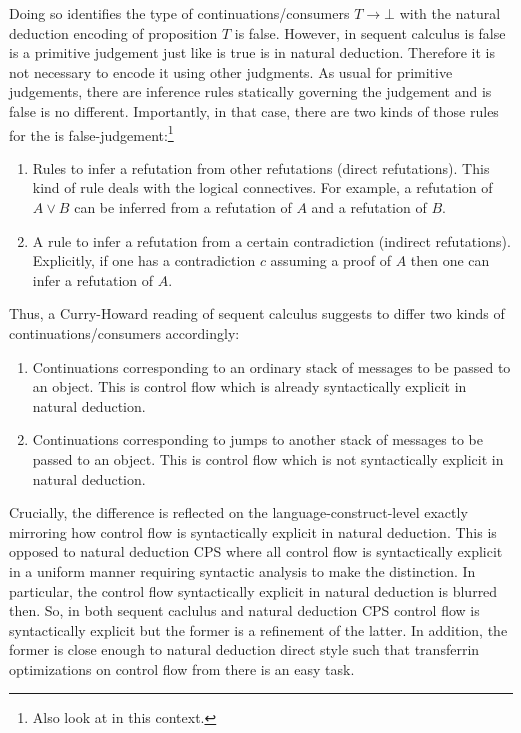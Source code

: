 Doing so identifies the type of continuations/consumers $T \to \bot$ with the natural deduction encoding of {\glqq}proposition $T$ is false{\grqq}.
However, in sequent calculus {\glqq}is false{\grqq} is a primitive judgement just like {\glqq}is true{\grqq} is in natural deduction.
Therefore it is not necessary to encode it using other judgments.
As usual for primitive judgements, there are inference rules statically governing the judgement and {\glqq}is false{\grqq} is no different.
Importantly, in that case, there are two kinds of those rules for the {\glqq}is false{\grqq}-judgement:\footnote{Also look at \cite{zeilberger2008unity} in this context.}
\begin{enumerate}
  \item
    Rules to infer a refutation from other refutations (direct refutations).
    This kind of rule deals with the logical connectives.
    For example, a refutation of $A \lor B$ can be inferred from a refutation of $A$ and a refutation of $B$.
  \item
    A rule to infer a refutation from a certain contradiction (indirect refutations).
    Explicitly, if one has a contradiction $c$ assuming a proof of $A$ then one can infer a refutation of $A$.
\end{enumerate}
Thus, a Curry-Howard reading of sequent calculus suggests to differ two kinds of continuations/consumers accordingly:
\begin{enumerate}
  \item
    Continuations corresponding to an ordinary stack of messages to be passed to an object. This is control flow which is already syntactically explicit in natural deduction.
  \item
    Continuations corresponding to jumps to another stack of messages to be passed to an object. This is control flow which is not syntactically explicit in natural deduction.
\end{enumerate}
Crucially, the difference is reflected on the language-construct-level exactly mirroring how control flow is syntactically explicit in natural deduction.
This is opposed to natural deduction CPS where all control flow is syntactically explicit in a uniform manner requiring syntactic analysis to make the distinction.
In particular, the control flow syntactically explicit in natural deduction is blurred then.
So, in both sequent caclulus and natural deduction CPS control flow is syntactically explicit but the former is a refinement of the latter.
In addition, the former is close enough to natural deduction direct style such that transferrin optimizations on control flow from there is an easy task.
